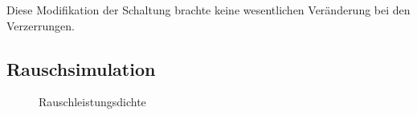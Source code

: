 Diese Modifikation der Schaltung brachte keine wesentlichen Veränderung bei den Verzerrungen. 

\subsection{Rauschsimulation}

\begin{figure}[H]
	\centering \small
	\scalebox{0.9}{}
	\caption{Rauschleistungsdichte}
	\label{fig_Kap5_23:Mag}
\end{figure}


